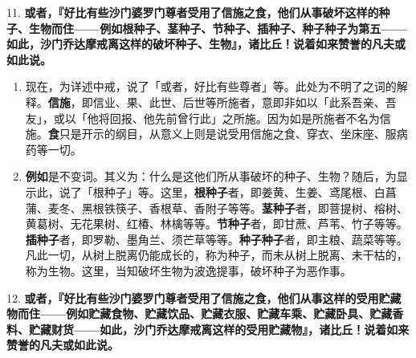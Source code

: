 {\Large 11.} \textbf{或者，『好比有些沙门婆罗门尊者受用了信施之食，他们从事破坏这样的种子、生物而住——例如根种子、茎种子、节种子、插种子、种子种子为第五——如此，沙门乔达摩戒离这样的破坏种子、生物』，诸比丘！说着如来赞誉的凡夫或如此说。}

\begin{enumerate}\item 现在，为详述中戒，说了「或者，好比有些尊者」等。此处为不明了之词的解释。\textbf{信施}，即信业、果、此世、后世等所施者，意即非如以「此系吾亲、吾友」，或以「他将回报、他先前曾行此」之所施。因为如是所施者不名为信施。\textbf{食}只是开示的纲目，从意义上则是说受用信施之食、穿衣、坐床座、服病药等一切。
\item \textbf{例如}是不变词。其义为：什么是这他们所从事破坏的种子、生物？随后，为显示此，说了「根种子」等。这里，\textbf{根种子}者，即姜黄、生姜、鸢尾根、白菖蒲、麦冬、黑根铁筷子、香根草、香附子等等。\textbf{茎种子}者，即菩提树、榕树、黄葛树、无花果树、红椿、林檎等等。\textbf{节种子}者，即甘蔗、芦苇、竹子等等。\textbf{插种子}者，即罗勒、墨角兰、须芒草等等。\textbf{种子种子}者，即主粮、蔬菜等等。凡此一切，从树上脱离仍能成长的，称为种子，而未从树上脱离、未干枯的，称为生物。这里，当知破坏生物为波逸提事，破坏种子为恶作事。\end{enumerate}

{\Large 12.} \textbf{或者，『好比有些沙门婆罗门尊者受用了信施之食，他们从事这样的受用贮藏物而住——例如贮藏食物、贮藏饮品、贮藏衣服、贮藏车乘、贮藏卧具、贮藏香料、贮藏财货——如此，沙门乔达摩戒离这样的受用贮藏物』，诸比丘！说着如来赞誉的凡夫或如此说。}

